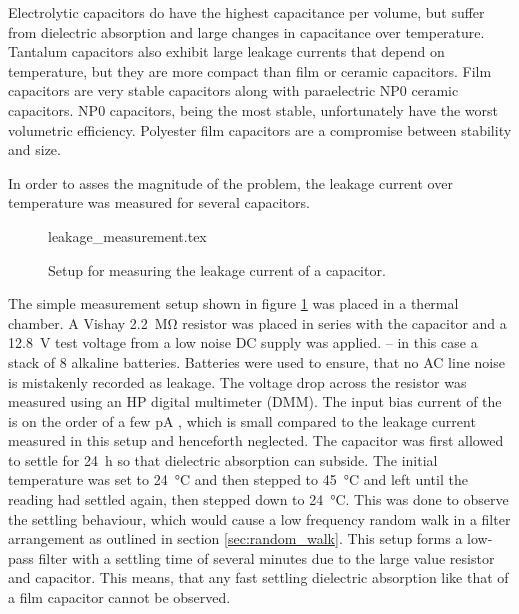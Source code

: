 Electrolytic capacitors do have the highest capacitance per volume, but suffer from dielectric absorption and large changes in capacitance over temperature. Tantalum capacitors also exhibit large leakage currents \cite{tantalum_leakage} that depend on temperature, but they are more compact than film or ceramic capacitors. Film capacitors are very stable capacitors along with paraelectric NP0 ceramic capacitors. NP0 capacitors, being the most stable, unfortunately have the worst volumetric efficiency. Polyester film capacitors are a compromise between stability and size.

In order to asses the magnitude of the problem, the leakage current over temperature was measured for several capacitors.
\begin{figure}[ht]
    \centering
        {leakage_measurement.tex}
    \caption{Setup for measuring the leakage current of a capacitor.}
    \label{fig:capacitor_leakage_measurement}
\end{figure}

The simple measurement setup shown in figure \ref{fig:capacitor_leakage_measurement} was placed in a thermal chamber. A Vishay  \qty{2.2}{\mega\ohm} resistor was placed in series with the capacitor and a \qty{12.8}{\V} test voltage from a low noise DC supply was applied. -- in this case a stack of \num{8} alkaline batteries. Batteries were used to ensure, that no AC line noise is mistakenly recorded as leakage. The voltage drop across the resistor was measured using an HP  digital multimeter (DMM). The input bias current of the  is on the order of a few \unit{\pA} \cite{article_3458A_input_impedance, article_3458A_input_impedance_2}, which is small compared to the leakage current measured in this setup and henceforth neglected. The capacitor was first allowed to settle for \qty{24}{\hour} so that dielectric absorption can subside. The initial temperature was set to \qty{24}{\celsius} and then stepped to \qty{45}{\celsius} and left until the reading had settled again, then stepped down to \qty{24}{\celsius}. This was done to observe the settling behaviour, which would cause a low frequency random walk in a filter arrangement as outlined in section \ref{sec:random_walk}. This setup forms a low-pass filter with a settling time of several minutes due to the large value resistor and capacitor. This means, that any fast settling dielectric absorption like that of a film capacitor cannot be observed.

